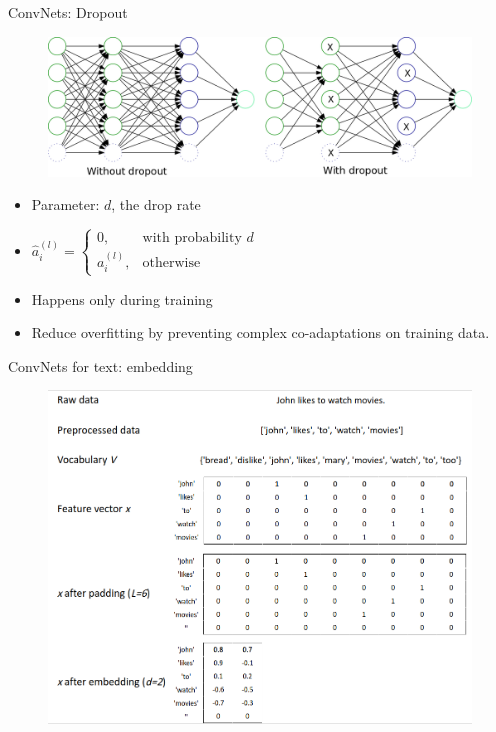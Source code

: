 \documentclass{beamer}
\begin{document}
\begin{frame}{ConvNets: Dropout}
\begin{figure}
    \centering
    \includegraphics[scale=0.3]{images/Dropout.png}
\end{figure}

\begin{itemize}
    \item Parameter: $d$, the drop rate
    \item $\hat{a}_i^{(l)} =
    \begin{cases}
      0, & \text{with probability }d \\
      a_i^{(l)}, & \text{otherwise}
    \end{cases}$
    \item Happens only during training
    \item Reduce overfitting by preventing complex co-adaptations on training data.
\end{itemize}
    
\end{frame}

\begin{frame}{ConvNets for text: embedding}
\begin{figure}
    \centering
    \includegraphics[scale=0.28]{images/Embedding.png}
\end{figure}    
\end{frame}
\end{document}
